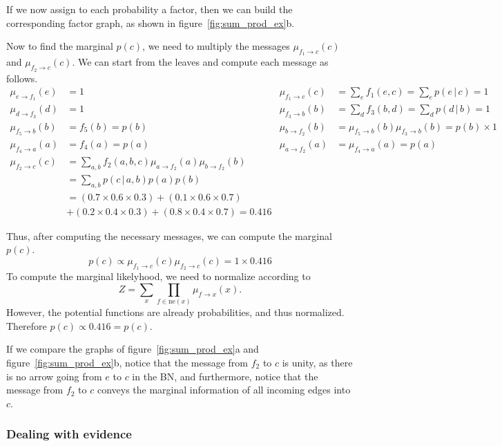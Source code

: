 \documentclass{article}
\newcommand{\giv}{\,|\,}
\begin{document}
\noindent If we now assign to each probability a factor, then we can build the corresponding factor graph, as shown in figure~\ref{fig:sum_prod_ex}b. 

Now to find the marginal $p(c)$, we need to multiply the messages $\mu_{f_1 \rightarrow c}(c)$ and $\mu_{f_2 \rightarrow c}(c)$. We can start from the leaves and compute each message as follows. 
\begin{align*}
    \mu_{e \rightarrow f_1}(e) &= 1 \qquad & \mu_{f_1 \rightarrow c}(c) &= \sum_e f_1(e, c) = \sum_e p(e \giv c) = 1 \\
    \mu_{d \rightarrow f_3}(d) &= 1 \qquad & \mu_{f_3 \rightarrow b}(b) &= \sum_d f_3(b, d) = \sum_d p(d \giv b) = 1 \\
    \mu_{f_5 \rightarrow b}(b) &= f_5(b) = p(b) \qquad & \mu_{b \rightarrow f_2}(b) &= \mu_{f_5 \rightarrow b}(b) \mu_{f_3 \rightarrow b}(b) = p(b) \times 1 \\
    \mu_{f_4 \rightarrow a}(a) &= f_4(a) = p(a) \qquad & \mu_{a \rightarrow f_2}(a) &= \mu_{f_4 \rightarrow a}(a) = p(a)\\
    \mu_{f_2 \rightarrow c}(c) &= \sum_{a, b} f_2(a, b, c) \mu_{a \rightarrow f_2}(a) \mu_{b \rightarrow f_2}(b)\\
    &= \sum_{a, b} p(c \giv a, b) p(a) p(b)\\
    &= (0.7 \times 0.6 \times 0.3) + (0.1 \times 0.6 \times 0.7) \\
    &+ (0.2 \times 0.4 \times 0.3) + (0.8 \times 0.4 \times 0.7) = 0.416
\end{align*}

\noindent Thus, after computing the necessary messages, we can compute the marginal $p(c)$. 
$$
    p(c) \propto \mu_{f_1 \rightarrow c}(c) \mu_{f_2 \rightarrow c}(c) = 1 \times 0.416
$$
\noindent To compute the marginal likelyhood, we need to normalize according to 
$$
    Z = \sum_x \prod_{f \in \text{ne}(x)} \mu_{f \rightarrow x}(x).
$$
\noindent However, the potential functions are already probabilities, and thus normalized. Therefore $p(c) \propto 0.416 = p(c)$. 

If we compare the graphs of figure~\ref{fig:sum_prod_ex}a and figure~\ref{fig:sum_prod_ex}b, notice that the message from $f_2$ to $c$ is unity, as there is no arrow going from $e$ to $c$ in the BN, and furthermore, notice that the message from $f_2$ to $c$ conveys the marginal information of all incoming edges into $c$. 

\subsubsection{Dealing with evidence}
\end{document}
